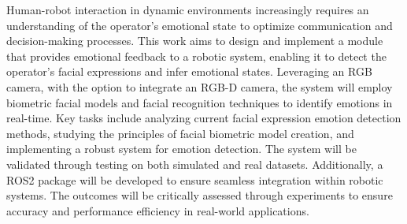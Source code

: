 Human-robot interaction in dynamic environments increasingly requires an understanding of the operator's emotional state to optimize communication and decision-making processes. This work aims to design and implement a module that provides emotional feedback to a robotic system, enabling it to detect the operator's facial expressions and infer emotional states. Leveraging an RGB camera, with the option to integrate an RGB-D camera, the system will employ biometric facial models and facial recognition techniques to identify emotions in real-time. Key tasks include analyzing current facial expression emotion detection methods, studying the principles of facial biometric model creation, and implementing a robust system for emotion detection. The system will be validated through testing on both simulated and real datasets. Additionally, a ROS2 package will be developed to ensure seamless integration within robotic systems. The outcomes will be critically assessed through experiments to ensure accuracy and performance efficiency in real-world applications.